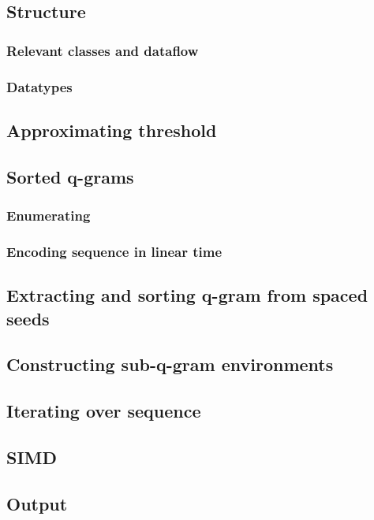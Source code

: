 \documentclass[11pt,a4paper]{scrartcl}
\begin{document}
\subsection{Structure}
\subsubsection{Relevant classes and dataflow}

\subsubsection{Datatypes}

\subsection{Approximating threshold}

\subsection{Sorted q-grams}

\subsubsection{Enumerating}
\subsubsection{Encoding sequence in linear time}
\subsection{Extracting and sorting q-gram from spaced seeds}

\subsection{Constructing sub-q-gram environments}

\subsection{Iterating over sequence}

\subsection{SIMD}

\subsection{Output}

\end{document}
